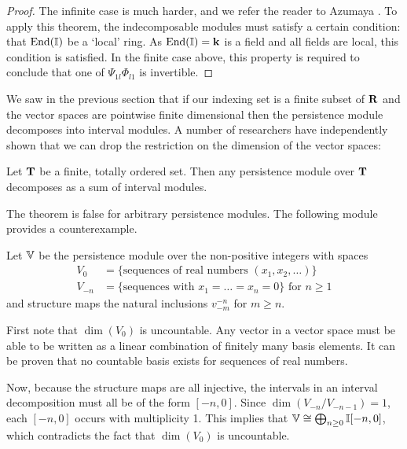 \begin{proof}
The infinite case is much harder, and we refer the reader to Azumaya \cite{azumaya1950corrections}. To apply this theorem, the indecomposable modules must satisfy a certain condition: that $\operatorname{End}(\mathbb{I})$ be a `local' ring. As $\operatorname{End}(\mathbb{I}) = \mathbf{k}$ is a field and all fields are local, this condition is satisfied. In the finite case above, this property is required to conclude that one of $\Psi_{1l} \Phi_{l1}$ is invertible.
\end{proof}

We saw in the previous section that if our indexing set is a finite subset of $\mathbf{R}$ and the vector spaces are pointwise finite dimensional then the persistence module decomposes into interval modules. A number of researchers have independently shown that we can drop the restriction on the dimension of the vector spaces:

\begin{theorem}
Let $\mathbf{T}$ be a finite, totally ordered set. Then any persistence module over $\mathbf{T}$ decomposes as a sum of interval modules.
\label{thm-finite-decomposition}
\end{theorem}

The theorem is false for arbitrary persistence modules. The following module provides a counterexample.

\begin{example}
Let $\mathbb{V}$ be the persistence module over the non-positive integers with spaces
\begin{align*}
V_0 &= \{ \text{sequences of real numbers } (x_1, x_2, \dots) \}\\
V_{-n} &= \{ \text{sequences with } x_1 = \dots = x_n = 0 \} \text{ for } n \geq 1
\end{align*}
and structure maps the natural inclusions $v_{-m}^{-n}$ for $m \geq n$.

First note that $\dim(V_0)$ is uncountable. Any vector in a vector space must be able to be written as a linear combination of finitely many basis elements. It can be proven that no countable basis exists for sequences of real numbers.

Now, because the structure maps are all injective, the intervals in an interval decomposition must all be of the form $[-n, 0]$. Since $\dim(V_{-n}/V_{-n-1}) = 1$, each $[-n,0]$ occurs with multiplicity 1. This implies that $\mathbb{V} \cong \bigoplus_{n\geq0} \mathbb{I}[-n, 0]$, which contradicts the fact that $\dim(V_0)$ is uncountable.
\end{example}

